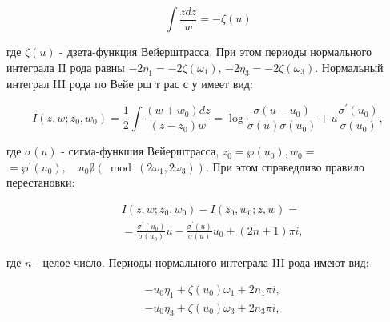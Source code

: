 \documentclass[10pt]{article}
\begin{document}
\[

\int \frac{z d z}{w}=-\zeta(u)

\]



где $\zeta(u)$ - дзета-функция Вейерштрасса. При этом периоды нормального интеграла II рода равны $-2 \eta_{1}=-2 \zeta\left(\omega_{1}\right)$, $-2 \eta_{3}=-2 \zeta\left(\omega_{3}\right)$. Нормальный интеграл III рода по Вейе рш т рас с у имеет вид:



\[

I\left(z, w ; z_{0}, w_{0}\right)=\frac{1}{2} \int \frac{\left(w+w_{0}\right) d z}{\left(z-z_{0}\right) w}=\log \frac{\sigma\left(u-u_{0}\right)}{\sigma(u) \sigma\left(u_{0}\right)}+u \frac{\sigma^{\prime}\left(u_{0}\right)}{\sigma\left(u_{0}\right)},

\]



где $\sigma(u)$ - сигма-функшия Вейерштрасса, $z_{0}=\wp\left(u_{0}\right), w_{0}=$ $=\wp^{\prime}\left(u_{0}\right), \quad u_{0} \not 0\left(\bmod \left(2 \omega_{1}, 2 \omega_{3}\right)\right)$. При этом справедливо правило перестановки:



\[

\begin{aligned}

& I\left(z, w ; z_{0}, w_{0}\right)-I\left(z_{0}, w_{0} ; z, w\right)= \\

& =\frac{\sigma^{\prime}\left(u_{0}\right)}{\sigma\left(u_{0}\right)} u-\frac{\sigma^{\prime}(u)}{\sigma(u)} u_{0}+(2 n+1) \pi i,

\end{aligned}

\]



где $n$ - целое число. Периоды нормального интеграла III рода имеют вид:



\[

\begin{aligned}

& -u_{0} \eta_{1}+\zeta\left(u_{0}\right) \omega_{1}+2 n_{1} \pi i, \\

& -u_{0} \eta_{3}+\zeta\left(u_{0}\right) \omega_{3}+2 n_{3} \pi i,

\end{aligned}

\]
\end{document}
